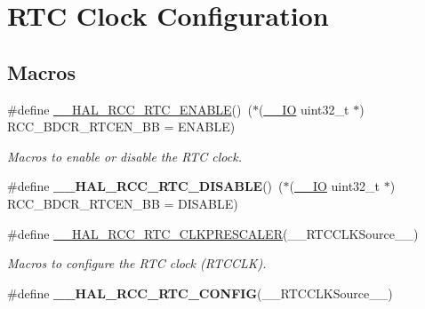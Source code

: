 \hypertarget{group___r_c_c___internal___r_t_c___clock___configuration}{}\section{R\+TC Clock Configuration}
\label{group___r_c_c___internal___r_t_c___clock___configuration}
\subsection*{Macros}
\begin{DoxyCompactItemize}
\item 
\#define \hyperlink{group___r_c_c___internal___r_t_c___clock___configuration_gab7cc36427c31da645a0e38e181f8ce0f}{\+\_\+\+\_\+\+H\+A\+L\+\_\+\+R\+C\+C\+\_\+\+R\+T\+C\+\_\+\+E\+N\+A\+B\+LE}()~($\ast$(\hyperlink{core__sc300_8h_aec43007d9998a0a0e01faede4133d6be}{\+\_\+\+\_\+\+IO} uint32\+\_\+t $\ast$) R\+C\+C\+\_\+\+B\+D\+C\+R\+\_\+\+R\+T\+C\+E\+N\+\_\+\+BB = E\+N\+A\+B\+LE)
\begin{DoxyCompactList}\small\item\em Macros to enable or disable the R\+TC clock. \end{DoxyCompactList}\item 
\mbox{\label{group___r_c_c___internal___r_t_c___clock___configuration_gaab5eeb81fc9f0c8d4450069f7a751855}} 
\#define {\bfseries \+\_\+\+\_\+\+H\+A\+L\+\_\+\+R\+C\+C\+\_\+\+R\+T\+C\+\_\+\+D\+I\+S\+A\+B\+LE}()~($\ast$(\hyperlink{core__sc300_8h_aec43007d9998a0a0e01faede4133d6be}{\+\_\+\+\_\+\+IO} uint32\+\_\+t $\ast$) R\+C\+C\+\_\+\+B\+D\+C\+R\+\_\+\+R\+T\+C\+E\+N\+\_\+\+BB = D\+I\+S\+A\+B\+LE)
\item 
\#define \hyperlink{group___r_c_c___internal___r_t_c___clock___configuration_ga7e10e306e7d9f3cd59d30dcb2c9cf61d}{\+\_\+\+\_\+\+H\+A\+L\+\_\+\+R\+C\+C\+\_\+\+R\+T\+C\+\_\+\+C\+L\+K\+P\+R\+E\+S\+C\+A\+L\+ER}(\+\_\+\+\_\+\+R\+T\+C\+C\+L\+K\+Source\+\_\+\+\_\+)
\begin{DoxyCompactList}\small\item\em Macros to configure the R\+TC clock (R\+T\+C\+C\+LK). \end{DoxyCompactList}\item 
\#define {\bfseries \+\_\+\+\_\+\+H\+A\+L\+\_\+\+R\+C\+C\+\_\+\+R\+T\+C\+\_\+\+C\+O\+N\+F\+IG}(\+\_\+\+\_\+\+R\+T\+C\+C\+L\+K\+Source\+\_\+\+\_\+)
\item 

\end{DoxyCompactItemize}
